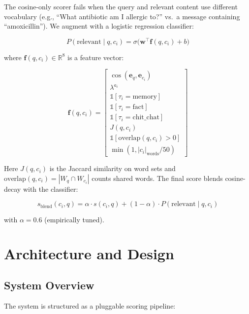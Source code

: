 \documentclass[11pt,a4paper]{article}
\begin{document}
The cosine-only scorer fails when the query and relevant content use different
vocabulary (e.g., ``What antibiotic am I allergic to?'' vs.\ a message containing
``amoxicillin''). We augment with a logistic regression classifier:

\begin{equation}
P(\text{relevant} \mid q, c_i) = \sigma\bigl(\mathbf{w}^\top \mathbf{f}(q, c_i) + b\bigr)
\end{equation}

where $\mathbf{f}(q, c_i) \in \mathbb{R}^8$ is a feature vector:

\begin{equation}
\mathbf{f}(q, c_i) = \begin{bmatrix}
\cos(\mathbf{e}_q, \mathbf{e}_{c_i}) \\
\lambda^{a_i} \\
\mathbb{1}[\tau_i = \text{memory}] \\
\mathbb{1}[\tau_i = \text{fact}] \\
\mathbb{1}[\tau_i = \text{chit\_chat}] \\
J(q, c_i) \\
\mathbb{1}[\text{overlap}(q, c_i) > 0] \\
\min(1, |c_i|_\text{words} / 50)
\end{bmatrix}
\end{equation}

Here $J(q, c_i)$ is the Jaccard similarity on word sets and
$\text{overlap}(q, c_i) = |W_q \cap W_{c_i}|$ counts shared words. The final
score blends cosine-decay with the classifier:

\begin{equation}
s_\text{blend}(c_i, q) = \alpha \cdot s(c_i, q) + (1 - \alpha) \cdot P(\text{relevant} \mid q, c_i)
\end{equation}

with $\alpha = 0.6$ (empirically tuned).

\section{Architecture and Design}
\label{sec:architecture}

\subsection{System Overview}

The system is structured as a pluggable scoring pipeline:
\end{document}

